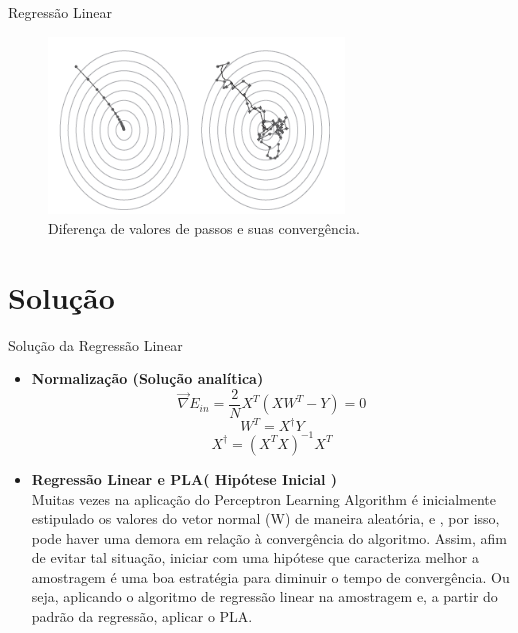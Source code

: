 \documentclass{beamer}
\begin{document}
\begin{frame}{Regressão Linear}
\begin{figure}
\centering
\includegraphics[width = 0.7\textwidth]{Gradiente.png}
\caption{Diferença de valores de passos e suas convergência.}
\end{figure}
\end{frame}
 
 \section{Solução}
 
 \begin{frame}{Solução da Regressão Linear}
 
 \begin{itemize}
 \item \textbf{ Normalização (Solução analítica)}
 \begin{equation}
 \vec{\nabla} E_{in} = \frac{2}{N} X^T \left( XW^T - Y \right) = 0
 \end{equation}
 \begin{equation}
	 W^T = X^{\dagger} Y
 \end{equation}
 \begin{equation}
 X^{\dagger} = \left( X^T X \right)^{-1} X^T
 \end{equation}
 \item \textbf{ Regressão Linear e PLA( Hipótese Inicial )}\\
 Muitas vezes na aplicação do Perceptron Learning Algorithm é inicialmente estipulado os valores do vetor normal (W) de maneira aleatória, e , por isso, pode haver uma demora em relação à convergência do algoritmo. Assim, afim de evitar tal situação, iniciar com uma hipótese que caracteriza melhor a amostragem é uma boa estratégia para diminuir o tempo de convergência. Ou seja, aplicando o algoritmo de regressão linear na amostragem e, a partir do padrão da regressão, aplicar o PLA. 
 \end{itemize}
 \end{frame}
 
\end{document}
